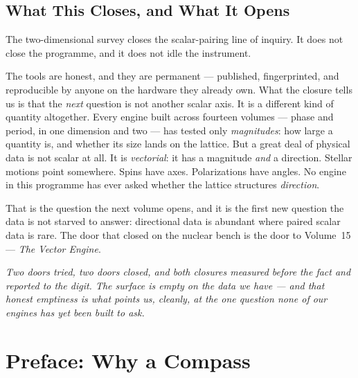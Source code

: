 \documentclass[11pt, letterpaper, openany]{book}
\begin{document}
\section{What This Closes, and What It Opens}

The two-dimensional survey closes the scalar-pairing line of inquiry. It does not close the
programme, and it does not idle the instrument.

\begin{signalbox}
The tools are honest, and they are permanent --- published, fingerprinted, and reproducible by
anyone on the hardware they already own. What the closure tells us is that the \emph{next} question
is not another scalar axis. It is a different kind of quantity altogether. Every engine built across
fourteen volumes --- phase and period, in one dimension and two --- has tested only \emph{magnitudes}:
how large a quantity is, and whether its size lands on the lattice. But a great deal of physical data
is not scalar at all. It is \emph{vectorial}: it has a magnitude \emph{and} a direction. Stellar
motions point somewhere. Spins have axes. Polarizations have angles. No engine in this programme has
ever asked whether the lattice structures \emph{direction}.

That is the question the next volume opens, and it is the first new question the data is not starved
to answer: directional data is abundant where paired scalar data is rare. The door that closed on the
nuclear bench is the door to Volume~15 --- \textit{The Vector Engine}.
\end{signalbox}

\begin{center}
\vspace{0.5em}
\itshape
Two doors tried, two doors closed, and both closures measured before the fact and reported to the
digit. The surface is empty on the data we have --- and that honest emptiness is what points us,
cleanly, at the one question none of our engines has yet been built to ask.
\vspace{0.5em}
\end{center}

\chapter*{Preface: Why a Compass}
\end{document}

